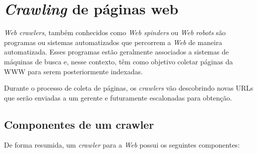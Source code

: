 \documentclass[10pt,twocolumn]{article}
\begin{document}
\section{\emph{Crawling} de páginas web}

\emph{Web crawlers}, também conhecidos como \emph{Web spinders} ou
\emph{Web robots} são programas ou sistemas automatizados que percorrem
a \emph{Web} de maneira automatizada. Esses programas estão geralmente
associados a sistemas de máquinas de busca e, nesse contexto, têm como
objetivo coletar páginas da WWW para serem posteriormente indexadas.

Durante o processo de coleta de páginas, os \emph{crawlers} vão
descobrindo novas URLs que serão enviadas a um gerente e futuramente
escalonadas para obtenção.

\subsection{Componentes de um crawler}

De forma resumida, um \emph{crawler} para a \emph{Web} possui os
seguintes componentes:
\end{document}
